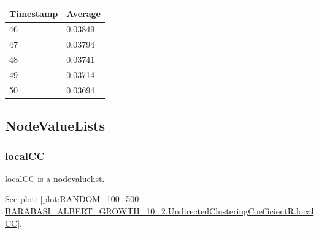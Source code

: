 \begin{tabular}{|l||l|}
\hline
	\textbf{Timestamp} & \textbf{Average} \\ \hline
	46 & 0.03849 \\ \hline
	47 & 0.03794 \\ \hline
	48 & 0.03741 \\ \hline
	49 & 0.03714 \\ \hline
	50 & 0.03694 \\ \hline
\end{tabular}


\subsection{NodeValueLists}
\subsubsection{localCC}
localCC is a nodevaluelist.

See plot: \ref{plot:RANDOM_100_500 - BARABASI_ALBERT_GROWTH_10_2.UndirectedClusteringCoefficientR.localCC}.

%
%

